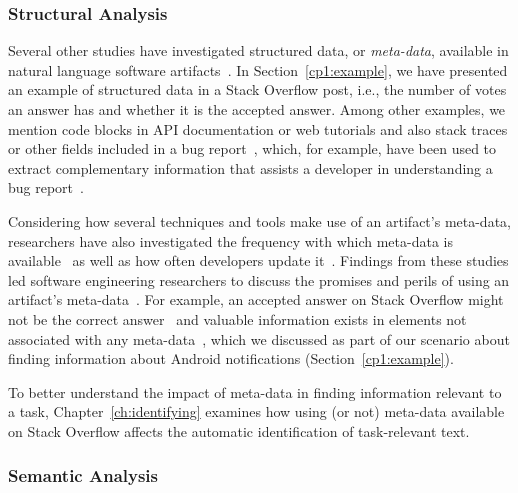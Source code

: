 \subsubsection{Structural Analysis}

Several other studies have 
investigated structured data, or \textit{meta-data}, available in
natural language software artifacts~\cite{Ponzanelli2015}. In Section~\ref{cp1:example},
we have presented an example of structured data in a Stack Overflow post, 
i.e., the number of votes an answer has and whether it is the accepted answer.
Among other examples, we mention 
code blocks in API documentation or web tutorials 
and also stack traces or other fields included in a bug report~\cite{Davies2014, Breu2010},
which, for example, have been used to 
extract complementary 
information that assists a developer in understanding a bug report~\cite{bettenburg2008}.


Considering how several techniques and tools make use of an artifact's meta-data, 
researchers have also
investigated the frequency with which
meta-data is available~\cite{Davies2014, bettenburg2008makes, uddin2015} 
as well as how often developers update it~\cite{ahmad2018, dig2006, shi2011}.
Findings from these studies led 
software engineering researchers to discuss the promises and perils of 
using an artifact's meta-data~\cite{kalliamvakou2014, ahmad2018}.
For example, an accepted answer on Stack Overflow 
might not be the correct answer~\cite{wang2018}
and 
valuable information exists in elements not
associated with any meta-data~\cite{zhang2019so},
which we discussed as part of our 
scenario about finding information about Android notifications (Section~\ref{cp1:example}).


To better understand the impact of meta-data in finding information 
relevant to a task, Chapter~\ref{ch:identifying} 
examines how using (or not) meta-data available on 
Stack Overflow affects the automatic identification 
of task-relevant text.





\subsubsection{Semantic Analysis} 

